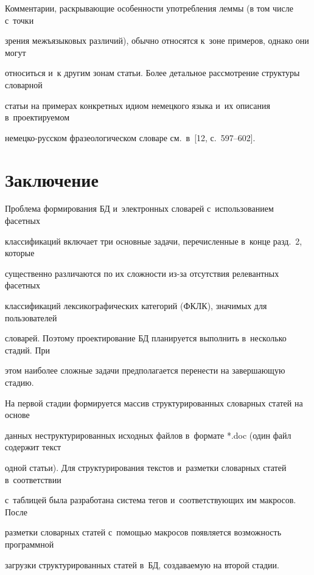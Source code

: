   Комментарии, раскрывающие особенности употребления леммы (в том числе с~точки 

зрения межъязыковых различий), обычно относятся к~зоне примеров, однако они могут 

относиться и~к другим зонам статьи. Более детальное рассмотрение структуры словарной 

статьи на примерах конкретных идиом немецкого языка и~их описания в~проектируемом 

немецко-русском фразеологическом словаре см.\ в~[12, с.~597--602].







  

\section{Заключение}



  Проблема формирования БД и~электронных словарей с~использованием фасетных 

классификаций включает три основные задачи, перечисленные в~конце разд.~2, которые 

существенно различаются по их сложности из-за отсутствия релевантных фасетных 

классификаций лексикографических категорий (ФКЛК), значимых для пользователей 

словарей. Поэтому проектирование БД планируется выполнить в~несколько стадий. При 

этом наиболее сложные задачи предполагается перенести на завершающую стадию.

  

  На первой стадии формируется массив структурированных словарных статей на основе 

данных неструктурированных исходных файлов в~формате *.doc (один файл содержит текст 

одной статьи). Для структурирования текстов и~разметки словарных статей в~соответствии 

с~таблицей была разработана система тегов и~соответствующих им макросов. После 

разметки словарных статей с~помощью макросов появляется возможность программной 

загрузки структурированных статей в~БД, создаваемую на второй стадии.

